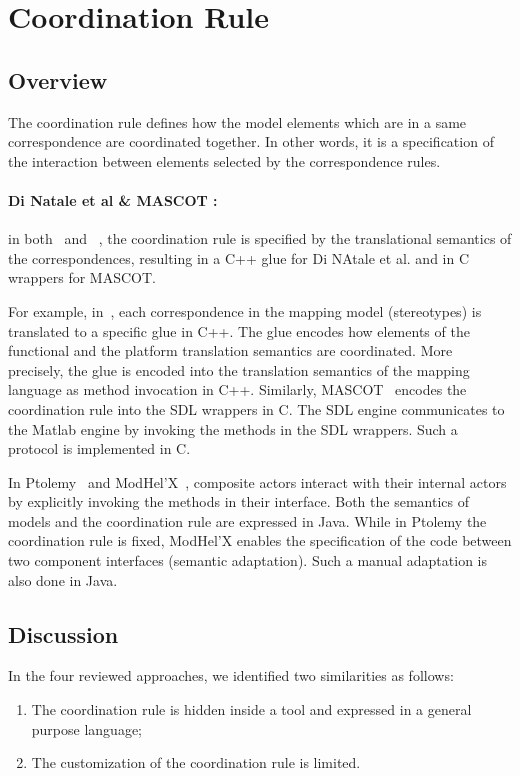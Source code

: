 \section{Coordination Rule}
\subsection{Overview}
The coordination rule defines how the model elements which are in a same correspondence are coordinated together. In other words, it is a specification of the interaction between elements selected by the correspondence rules.

\paragraph{Di Natale et al \& MASCOT :}
in both~\cite{dinatale} and ~\cite{mascotbib}, the coordination rule is specified by the translational semantics of the correspondences, \ie resulting in a C++ glue for Di NAtale et al. and in C wrappers for MASCOT. 

For example, in~\cite{dinatale}, each correspondence in the mapping model (\ie stereotypes) is translated to a specific glue in C++. The glue encodes how elements of the functional and the platform translation semantics are coordinated. More precisely, the glue is encoded into the translation semantics of the mapping language as method invocation in C++. Similarly, MASCOT~\cite{mascotbib} encodes the coordination rule into the SDL wrappers in C. The SDL engine communicates to the Matlab engine by invoking the methods in the SDL wrappers. Such a protocol is implemented in C. 
			
In Ptolemy~\cite{ptoleframebib} and ModHel'X~\cite{modhelxbib}, composite actors interact with their internal actors by explicitly invoking the methods in their interface. Both the semantics of models and the coordination rule are expressed in Java. While in Ptolemy the coordination rule is fixed, ModHel'X enables the specification of the code between two component interfaces (\ie semantic adaptation). Such a manual adaptation is also done in Java.

\subsection{Discussion}
In the four reviewed approaches, we identified two similarities as follows:
	
\begin{enumerate}
\item The coordination rule is hidden inside a tool and expressed in a general purpose language;
\item The customization of the coordination rule is limited.
\end{enumerate}
		
